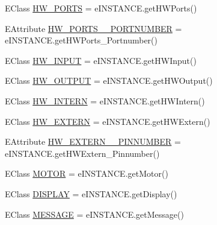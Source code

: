 \begin{DoxyCompactItemize}
\item 
E\-Class \hyperlink{interfaceshootingmachineemfmodel_1_1_shootingmachineemfmodel_package_1_1_literals_a240205c41ebf9293870a8a32fb0650c1}{H\-W\-\_\-\-P\-O\-R\-T\-S} = e\-I\-N\-S\-T\-A\-N\-C\-E.\-get\-H\-W\-Ports()
\item 
E\-Attribute \hyperlink{interfaceshootingmachineemfmodel_1_1_shootingmachineemfmodel_package_1_1_literals_a955807dd50799b8ae1cef72c95a2b854}{H\-W\-\_\-\-P\-O\-R\-T\-S\-\_\-\-\_\-\-P\-O\-R\-T\-N\-U\-M\-B\-E\-R} = e\-I\-N\-S\-T\-A\-N\-C\-E.\-get\-H\-W\-Ports\-\_\-\-Portnumber()
\item 
E\-Class \hyperlink{interfaceshootingmachineemfmodel_1_1_shootingmachineemfmodel_package_1_1_literals_a6e76f89e5af98b966439f2e0f19b6fc1}{H\-W\-\_\-\-I\-N\-P\-U\-T} = e\-I\-N\-S\-T\-A\-N\-C\-E.\-get\-H\-W\-Input()
\item 
E\-Class \hyperlink{interfaceshootingmachineemfmodel_1_1_shootingmachineemfmodel_package_1_1_literals_ae96d4be80e17f106f86c757095eb815a}{H\-W\-\_\-\-O\-U\-T\-P\-U\-T} = e\-I\-N\-S\-T\-A\-N\-C\-E.\-get\-H\-W\-Output()
\item 
E\-Class \hyperlink{interfaceshootingmachineemfmodel_1_1_shootingmachineemfmodel_package_1_1_literals_acb4d8b46ec5fe9a6ed9d4159335d3ce7}{H\-W\-\_\-\-I\-N\-T\-E\-R\-N} = e\-I\-N\-S\-T\-A\-N\-C\-E.\-get\-H\-W\-Intern()
\item 
E\-Class \hyperlink{interfaceshootingmachineemfmodel_1_1_shootingmachineemfmodel_package_1_1_literals_a1cb9e63ff1a806fd94974a6efeb9b059}{H\-W\-\_\-\-E\-X\-T\-E\-R\-N} = e\-I\-N\-S\-T\-A\-N\-C\-E.\-get\-H\-W\-Extern()
\item 
E\-Attribute \hyperlink{interfaceshootingmachineemfmodel_1_1_shootingmachineemfmodel_package_1_1_literals_acedf689d2322132a8d5c7d94d8cf5283}{H\-W\-\_\-\-E\-X\-T\-E\-R\-N\-\_\-\-\_\-\-P\-I\-N\-N\-U\-M\-B\-E\-R} = e\-I\-N\-S\-T\-A\-N\-C\-E.\-get\-H\-W\-Extern\-\_\-\-Pinnumber()
\item 
E\-Class \hyperlink{interfaceshootingmachineemfmodel_1_1_shootingmachineemfmodel_package_1_1_literals_a7bbdd7d8cb18d53b305d394e8c42b4b8}{M\-O\-T\-O\-R} = e\-I\-N\-S\-T\-A\-N\-C\-E.\-get\-Motor()
\item 
E\-Class \hyperlink{interfaceshootingmachineemfmodel_1_1_shootingmachineemfmodel_package_1_1_literals_ab8f98900ea17ced20aa67f00e65df0ac}{D\-I\-S\-P\-L\-A\-Y} = e\-I\-N\-S\-T\-A\-N\-C\-E.\-get\-Display()
\item 
E\-Class \hyperlink{interfaceshootingmachineemfmodel_1_1_shootingmachineemfmodel_package_1_1_literals_ab0be4348efbb58889f96804263c8b934}{M\-E\-S\-S\-A\-G\-E} = e\-I\-N\-S\-T\-A\-N\-C\-E.\-get\-Message()

\end{DoxyCompactItemize}
